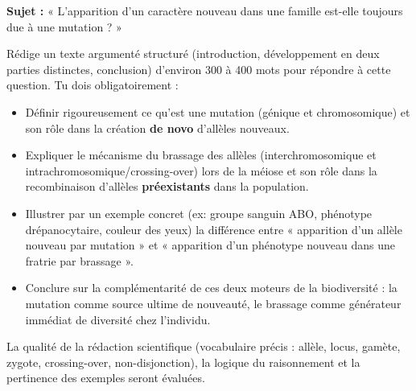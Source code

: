 \documentclass[11pt]{article}
\begin{document}
\begin{exercice}
\textbf{Sujet :} « L'apparition d'un caractère nouveau dans une famille est-elle toujours due à une mutation ? »

Rédige un texte argumenté structuré (introduction, développement en deux parties distinctes, conclusion) d'environ 300 à 400 mots pour répondre à cette question. Tu dois obligatoirement :
\begin{itemize}
    \item Définir rigoureusement ce qu'est une mutation (génique et chromosomique) et son rôle dans la création \textbf{de novo} d'allèles nouveaux.
    \item Expliquer le mécanisme du brassage des allèles (interchromosomique et intrachromosomique/crossing-over) lors de la méiose et son rôle dans la recombinaison d'allèles \textbf{préexistants} dans la population.
    \item Illustrer par un exemple concret (ex: groupe sanguin ABO, phénotype drépanocytaire, couleur des yeux) la différence entre « apparition d'un allèle nouveau par mutation » et « apparition d'un phénotype nouveau dans une fratrie par brassage ».
    \item Conclure sur la complémentarité de ces deux moteurs de la biodiversité : la mutation comme source ultime de nouveauté, le brassage comme générateur immédiat de diversité chez l'individu.
\end{itemize}
La qualité de la rédaction scientifique (vocabulaire précis : allèle, locus, gamète, zygote, crossing-over, non-disjonction), la logique du raisonnement et la pertinence des exemples seront évaluées.
\end{exercice}
\end{document}

